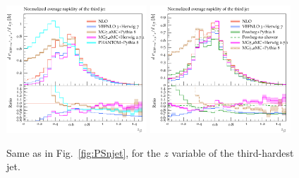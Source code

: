 \begin{figure}[hbt]
\centering
\includegraphics[width=0.47\textwidth]{figures/LOPS/z_j3.pdf}
\includegraphics[width=0.47\textwidth]{figures/NLOPS/z_j3.pdf}
\caption{Same as in Fig.~\protect\ref{fig:PSnjet}, for the $z$ variable of the third-hardest jet.}
\label{fig:PSz3}
\end{figure}

